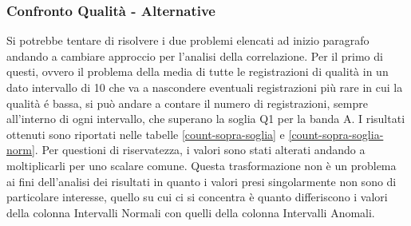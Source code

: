 \begin{table}[H]
	\begin{minipage}{.5\textwidth}
		\centering
		\label{mvm-confusion1}
	\end{minipage}
	\begin{minipage}{.5\textwidth}
		\centering
		\label{mvm-confusion2}
	\end{minipage}
\end{table}


\subsubsection{Confronto Qualità - Alternative}
Si potrebbe tentare di risolvere i due problemi elencati ad inizio paragrafo andando a cambiare approccio per l'analisi della correlazione.
Per il primo di questi, ovvero il problema della media di tutte le registrazioni di qualità in un dato intervallo di 10 che va a nascondere eventuali registrazioni più rare in cui la qualità é bassa, si può andare a contare il numero di registrazioni, sempre all'interno di ogni intervallo, che superano la soglia Q1 per la banda A.
I risultati ottenuti sono riportati nelle tabelle \ref{count-sopra-soglia} e \ref{count-sopra-soglia-norm}. Per questioni di riservatezza, i valori sono stati alterati andando a moltiplicarli per uno scalare comune. 
Questa trasformazione non è un problema ai fini dell'analisi dei risultati in quanto i valori presi singolarmente non sono di particolare interesse, quello su cui ci si concentra è quanto differiscono i valori della colonna Intervalli Normali con quelli della colonna Intervalli Anomali.



